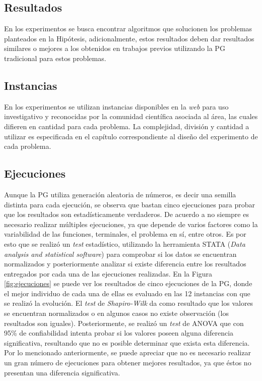 \subsection{Resultados}
En los experimentos se busca encontrar algoritmos que solucionen los problemas planteados en la Hipótesis, adicionalmente, estos resultados deben dar resultados similares o mejores a los obtenidos en trabajos previos utilizando la PG tradicional para estos problemas.

\subsection{Instancias}
En los experimentos se utilizan instancias disponibles en la \textit{web} para uso investigativo y reconocidas por la comunidad científica asociada al área, las cuales difieren en cantidad para cada problema. La complejidad, división y cantidad a utilizar es especificada en el capítulo correspondiente al diseño del experimento de cada problema.


\subsection{Ejecuciones}
Aunque la PG utiliza generación aleatoria de números, es decir una semilla distinta para cada ejecución, se observa que bastan cinco ejecuciones para probar que los resultados son estadísticamente verdaderos. De acuerdo a \citep{cantu_2003, li_2004} no siempre es necesario realizar múltiples ejecuciones, ya que depende de varios factores como la variabilidad de las funciones, terminales, el problema en sí, entre otros. Es por esto que se realizó un \textit{test} estadístico, utilizando la herramienta STATA (\textit{Data analysis and statistical software}) para comprobar si los datos se encuentran normalizados y posteriormente analizar si existe diferencia entre los resultados entregados por cada una de las ejecuciones realizadas. En la Figura \ref{fig:ejecuciones} se puede ver los resultados de cinco ejecuciones de la PG, donde el mejor individuo de cada una de ellas es evaluado en las 12 instancias con que se realizó la evolución. El \textit{test} de \textit{Shapiro-Wilk} da como resultado que los valores se encuentran normalizados o en algunos casos no existe observación (los resultados son iguales). Posteriormente, se realizó un \textit{test} de ANOVA que con 95\% de confiabilidad intenta probar si los valores poseen alguna diferencia significativa, resultando que no es posible determinar que exista esta diferencia. Por lo mencionado anteriormente, se puede apreciar que no es necesario realizar un gran número de ejecuciones para obtener mejores resultados, ya que éstos no presentan una diferencia significativa.

